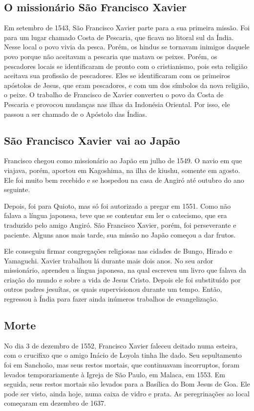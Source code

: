 \documentclass[11pt]{article}
\begin{document}
\begin{justify}
\subsection{O missionário São Francisco Xavier}

Em setembro de 1543, São Francisco Xavier parte para a sua primeira missão. Foi para um lugar chamado Costa de Pescaria, que ficava no litoral sul da Índia. Nesse local o povo vivia da pesca. Porém, os hindus se tornavam inimigos daquele povo porque não aceitavam a pescaria que matava os peixes. Porém, os pescadores locais se identificaram de pronto com o cristianismo, pois esta religião aceitava sua profissão de pescadores. Eles se identificaram com os primeiros apóstolos de Jesus, que eram pescadores, e com um dos símbolos da nova religião, o peixe. O trabalho de Francisco de Xavier converteu o povo da Costa de Pescaria e provocou mudanças nas ilhas da Indonésia Oriental. Por isso, ele passou a ser chamado de o Apóstolo das Índias.
\subsection{São Francisco Xavier vai ao Japão}

Francisco chegou como missionário ao Japão em julho de 1549. O navio em que viajava, porém, aportou em Kagoshima, na ilha de kiushu, somente em agosto. Ele foi muito bem recebido e se hospedou na casa de Angiró até outubro do ano seguinte.

Depois, foi para Quioto, mas só foi autorizado a pregar em 1551. Como não falava a língua japonesa, teve que se contentar em ler o catecismo, que era traduzido pelo amigo Angiró. São Francisco Xavier, porém, foi perseverante e paciente. Alguns anos mais tarde, sua missão no Japão começou a dar frutos.

Ele conseguiu firmar congregações religiosas nas cidades de Bungo, Hirado e Yamaguchi. Xavier trabalhou lá durante mais dois anos. No seu ardor missionário, aprendeu a língua japonesa, na qual escreveu um livro que falava da criação do mundo e sobre a vida de Jesus Cristo. Depois ele foi substituído por outros padres jesuítas, os quais supervisionou durante um tempo. Então, regressou à Índia para fazer ainda inúmeros trabalhos de evangelização.
\subsection{Morte}

No dia 3 de dezembro de 1552, Francisco Xavier faleceu deitado numa esteira, com o crucifixo que o amigo Inácio de Loyola tinha lhe dado. Seu sepultamento foi em Sanchoão, mas seus restos mortais, que continuavam incorruptos, foram levados temporariamente à Igreja de São Paulo, em Malaca, em 1553. Em seguida, seus restos mortais são levados para a Basílica do Bom Jesus de Goa. Ele pode ser visto, ainda hoje, numa caixa de vidro e prata. As peregrinações ao local começaram em dezembro de 1637.


\end{justify}
\end{document}
